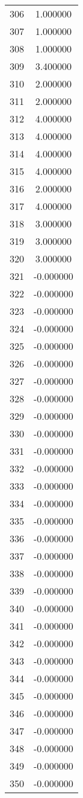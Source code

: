\documentclass[12pt]{article}
\begin{document}
\begin{longtable}{@{}cc@{}}
306 & 1.000000 \\
307 & 1.000000 \\
308 & 1.000000 \\
309 & 3.400000 \\
310 & 2.000000 \\
311 & 2.000000 \\
312 & 4.000000 \\
313 & 4.000000 \\
314 & 4.000000 \\
315 & 4.000000 \\
316 & 2.000000 \\
317 & 4.000000 \\
318 & 3.000000 \\
319 & 3.000000 \\
320 & 3.000000 \\
321 & -0.000000 \\
322 & -0.000000 \\
323 & -0.000000 \\
324 & -0.000000 \\
325 & -0.000000 \\
326 & -0.000000 \\
327 & -0.000000 \\
328 & -0.000000 \\
329 & -0.000000 \\
330 & -0.000000 \\
331 & -0.000000 \\
332 & -0.000000 \\
333 & -0.000000 \\
334 & -0.000000 \\
335 & -0.000000 \\
336 & -0.000000 \\
337 & -0.000000 \\
338 & -0.000000 \\
339 & -0.000000 \\
340 & -0.000000 \\
341 & -0.000000 \\
342 & -0.000000 \\
343 & -0.000000 \\
344 & -0.000000 \\
345 & -0.000000 \\
346 & -0.000000 \\
347 & -0.000000 \\
348 & -0.000000 \\
349 & -0.000000 \\
350 & -0.000000 \\

\end{longtable}
\end{document}

